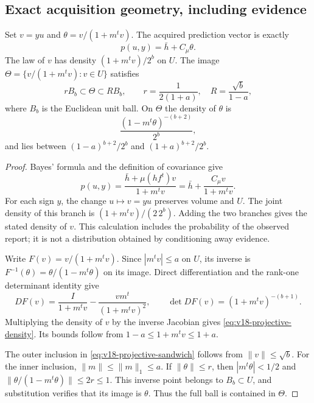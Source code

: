 \subsection{Exact acquisition geometry, including evidence}
\begin{lemma}\label{lem:v18-projective-law}
Set $v=yu$ and $\theta=v/(1+m^tv)$. The acquired prediction vector is
exactly
\begin{equation}\label{eq:v18-projective-prediction}
 p(u,y)=\bar h+C_\mu\theta.
\end{equation}
The law of $v$ has density $(1+m^tv)/2^b$ on $U$. The image
$\Theta=\{v/(1+m^tv):v\in U\}$ satisfies
\begin{equation}\label{eq:v18-projective-sandwich}
 rB_b\subset\Theta\subset RB_b,
 \qquad r=\frac1{2(1+a)},\quad R=\frac{\sqrt b}{1-a},
\end{equation}
where $B_b$ is the Euclidean unit ball. On $\Theta$ the density of
$\theta$ is
\begin{equation}\label{eq:v18-projective-density}
 \frac{(1-m^t\theta)^{-(b+2)}}{2^b},
\end{equation}
and lies between $(1-a)^{b+2}/2^b$ and $(1+a)^{b+2}/2^b$.
\end{lemma}
\begin{proof}
Bayes' formula and the definition of covariance give
\[
 p(u,y)=\frac{\bar h+\mu(hf^t)v}{1+m^tv}
       =\bar h+\frac{C_\mu v}{1+m^tv}.
\]
For each sign $y$, the change $u\mapsto v=yu$ preserves volume and
$U$. The joint density of this branch is
$(1+m^tv)/(2\,2^b)$. Adding the two branches gives the stated density
of $v$. This calculation includes the probability of the observed
report; it is not a distribution obtained by conditioning away evidence.

Write $F(v)=v/(1+m^tv)$. Since $|m^tv|\le a$ on $U$, its inverse is
$F^{-1}(\theta)=\theta/(1-m^t\theta)$ on its image. Direct
differentiation and the rank-one determinant identity give
\[
 DF(v)=\frac{I}{1+m^tv}-\frac{vm^t}{(1+m^tv)^2},\qquad
 \det DF(v)=(1+m^tv)^{-(b+1)}.
\]
Multiplying the density of $v$ by the inverse Jacobian gives
\eqref{eq:v18-projective-density}. Its bounds follow from
$1-a\le1+m^tv\le1+a$.

The outer inclusion in \eqref{eq:v18-projective-sandwich} follows from
$\|v\|\le\sqrt b$. For the inner inclusion, $\|m\|\le\|m\|_1\le a$.
If $\|\theta\|\le r$, then $|m^t\theta|<1/2$ and
$\|\theta/(1-m^t\theta)\|\le2r\le1$. This inverse point belongs
to $B_b\subset U$, and substitution verifies that its image is
$\theta$. Thus the full ball is contained in $\Theta$.
\end{proof}

